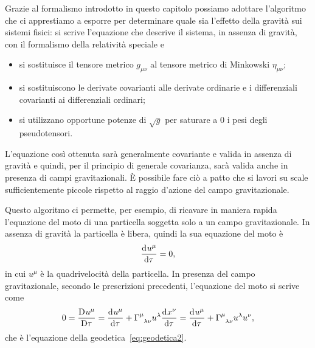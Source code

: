 Grazie al formalismo introdotto in questo capitolo possiamo adottare l'algoritmo
che ci apprestiamo a esporre per determinare quale sia l'effetto della gravità
sui sistemi fisici: si scrive l'equazione che descrive il sistema, in assenza di
gravità, con il formalismo della relatività speciale e
\begin{itemize}
\item si sostituisce il tensore metrico $g_{\mu\nu}$ al
  tensore metrico di Minkowski
  $\eta_{\mu\nu}$;
\item si sostituiscono le derivate covarianti alle
  derivate ordinarie e i differenziali
  covarianti ai differenziali ordinari;
\item si utilizzano opportune potenze di $\sqrt{g}$ per saturare a $0$ i pesi
  degli pseudotensori.
\end{itemize}
L'equazione così ottenuta sarà generalmente covariante e valida in assenza di
gravità e quindi, per il principio di
generale covarianza, sarà valida anche in presenza di campi gravitazionali.  È
possibile fare ciò a patto che si lavori su scale sufficientemente piccole
rispetto al raggio d'azione del campo gravitazionale.

Questo algoritmo ci permette, per esempio, di ricavare in maniera rapida
l'equazione del moto di una particella soggetta solo a un campo gravitazionale.
In assenza di gravità la particella è libera, quindi la sua equazione del moto è
\begin{equation}
  \frac{{\mathop{}\!\mathrm{d}^{}}u^{\mu}}{\mathop{}\!\mathrm{d} {\tau}^{}} = 0,
\end{equation}
in cui $u^{\mu}$ è la quadrivelocità della particella.  In
presenza del campo gravitazionale, secondo le prescrizioni precedenti,
l'equazione del moto si scrive come
\begin{equation}
  0 = \curder{u^{\mu}} = \toder{u^{\mu}}{\tau} +
  \tensor{\Gamma}{^{\mu}_{\lambda\nu}} u^{\lambda} \toder{x^{\nu}}{\tau} =
  \toder{u^{\mu}}{\tau} + \tensor{\Gamma}{^{\mu}_{\lambda\nu}} u^{\lambda}
  u^{\nu},
\end{equation}
che è l'equazione della
geodetica~\eqref{eq:geodetica2}.
